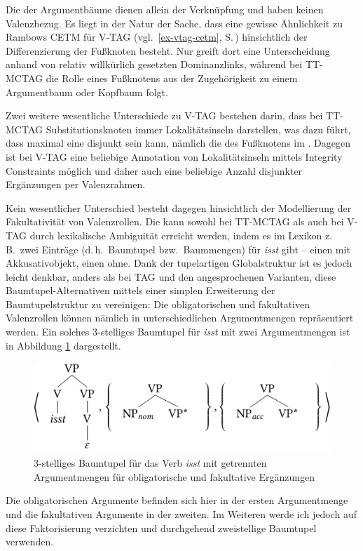 Die  der Argumentbäume dienen allein der Verknüpfung und haben keinen Valenzbezug. Es liegt in der Natur der Sache, dass eine gewisse Ähnlichkeit zu Rambows CETM für V-TAG (vgl.\ \ref{ex-vtag-cetm}, S.\,\pageref{ex-vtag-cetm}) hinsichtlich der Differenzierung der Fu\ss knoten besteht. Nur greift dort  eine Unterscheidung anhand von relativ willkürlich gesetzten Dominanzlinks, während bei TT-MCTAG die Rolle eines Fu\ss knotens aus der Zugehörigkeit zu einem Argumentbaum oder Kopfbaum folgt.   

Zwei weitere wesentliche Unterschiede zu V-TAG bestehen darin, dass bei TT-MCTAG Substitutionsknoten immer Lokalitätsinseln darstellen, was dazu führt, dass maximal eine  disjunkt sein kann, nämlich die des Fu\ss knotens im . Dagegen ist bei V-TAG eine beliebige Annotation von Lokalitätsinseln mittels Integrity Constraints möglich und daher auch eine beliebige Anzahl disjunkter Ergänzungen per Valenzrahmen.

Kein wesentlicher Unterschied besteht dagegen hinsichtlich der Modellierung der Fakultativität von Valenzrollen. Die kann sowohl bei TT-MCTAG als auch bei V-TAG durch lexikalische Ambiguität erreicht werden, indem es im Lexikon z.\,B.\ zwei Einträge (d.\,h.\ Baumtupel bzw.\ Baummengen) für {\it isst} gibt -- einen mit Akkusativobjekt, einen ohne. Dank der tupelartigen Globalstruktur ist es jedoch leicht denkbar, anders als bei TAG und den angesprochenen Varianten, diese Baumtupel-Alternativen mittels einer simplen Erweiterung der Baumtupelstruktur zu vereinigen: Die obligatorischen und fakultativen Valenzrollen können nämlich in unterschiedlichen Argumentmengen repräsentiert werden. Ein solches 3-stelliges Baumtupel für {\it isst} mit zwei Argumentmengen ist in Abbildung \ref{fig-ttmctag-3tupel} dargestellt. 
\begin{figure}[t]
\centering
\includegraphics{graphics/abb74.pdf}
\caption{\label{fig-ttmctag-3tupel}3-stelliges Baumtupel für das Verb {\it isst} mit getrennten Argumentmengen für obligatorische und fakultative Ergänzungen}
\end{figure} 
Die obligatorischen Argumente befinden sich hier in der ersten Argumentmenge und die fakultativen Argumente in der zweiten. Im Weiteren werde ich jedoch auf diese Faktorisierung verzichten und durchgehend zweistellige Baumtupel verwenden.



